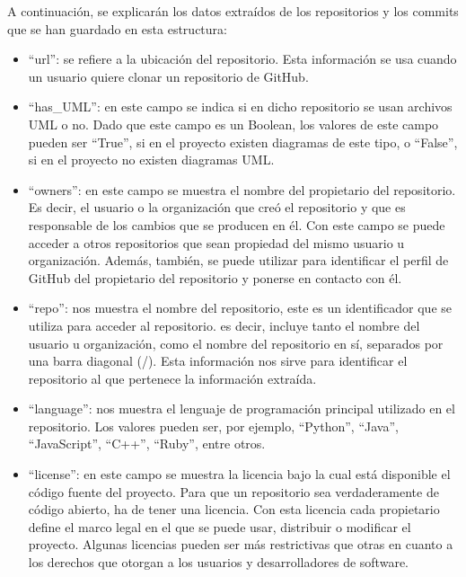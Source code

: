 \documentclass[a4paper, 12pt]{book}
\begin{document}
A continuación, se explicarán los datos extraídos de los repositorios y los commits que se han guardado en esta estructura:
\begin{itemize}

  \item ``url'': se refiere a la ubicación del repositorio.
  Esta información se usa cuando un usuario quiere clonar un repositorio de GitHub.

  \item ``has\_UML'': en este campo se indica si en dicho repositorio se usan archivos UML o no.
  Dado que este campo es un Boolean, los valores de este campo pueden ser ``True'', si en el proyecto existen diagramas de este tipo, o ``False'', si en el proyecto no existen diagramas UML.
  
  \item ``owners'': en este campo se muestra el nombre del propietario del repositorio. 
  Es decir, el usuario o la organización que creó el repositorio y que es responsable de los cambios que se producen en él. 
  Con este campo se puede acceder a otros repositorios que sean propiedad del mismo usuario u organización. 
  Además, también, se puede utilizar para identificar el perfil de GitHub del propietario del repositorio y ponerse en contacto con él.

  \item ``repo'': nos muestra el nombre del repositorio, este es un identificador que se utiliza para acceder al repositorio.  es decir, incluye tanto el nombre del usuario u organización, como el nombre del repositorio en sí, separados por una barra diagonal (/).
  Esta información nos sirve para identificar el repositorio al que pertenece la información extraída.

  \item ``language'': nos muestra el lenguaje de programación principal utilizado en el repositorio.
  Los valores pueden ser, por ejemplo, ``Python'', ``Java'', ``JavaScript'', ``C++'', ``Ruby'', entre otros.
  
  \item ``license'': en este campo se muestra la licencia bajo la cual está disponible el código fuente del proyecto.
  Para que un repositorio sea verdaderamente de código abierto, ha de tener una licencia. 
  Con esta licencia cada propietario define el marco legal en el que se puede usar, distribuir o modificar el proyecto.
  Algunas licencias pueden ser más restrictivas que otras en cuanto a los derechos que otorgan a los usuarios y desarrolladores de software.
  

\end{itemize}
\end{document}
